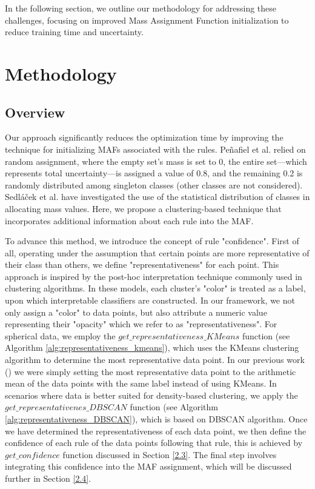 \documentclass[10pt,a4paper,oneside]{article}
\begin{document}
{\color{red}In the following section, we outline our methodology for addressing these challenges, focusing on improved Mass Assignment Function initialization to reduce training time and uncertainty.}
\section{Methodology}\label{1.2}
\subsection{Overview}\label{1.2.2}
Our approach significantly reduces the optimization time by improving the technique for initializing MAFs associated with the rules. Peñafiel et al. \cite{sergio} relied on random assignment, where the empty set's mass is set to 0, the entire set—which represents total uncertainty—is assigned a value of 0.8, and the remaining 0.2 is randomly distributed among singleton classes (other classes are not considered). {\color{black} Sedláček et al. \cite{czechs} have investigated the use of the statistical distribution of classes in allocating mass values}. Here{\color{black},} we propose a {\color{black} clustering-based} technique that incorporates additional information about each rule into the MAF. 

To advance this method, we introduce the concept of rule "confidence". First of all, operating under the assumption that certain points are more representative of their class than others{\color{black},} we define "representativeness" for each point. This approach is inspired by the post-hoc interpretation technique commonly used in clustering algorithms. In these models, each cluster's "color" is treated as a label, upon which interpretable classifiers are constructed. In our framework, we not only assign a "color" to data points{\color{black},} but also attribute a numeric value representing their "opacity" which we refer to as "representativeness". For spherical data, we employ the $get\_representativeness\_KMeans$ function (see Algorithm \ref{alg:representativeness_kmeans}), which uses the KMeans clustering algorithm \cite{kmeans} to determine the most representative data point. {\color{black}In our previous work (\cite{menq}) we were simply setting the most representative data point to the arithmetic mean of the data points with the same label instead of using KMeans.} In scenarios where data is better suited for density-based clustering, we apply the $get\_representativenes\_DBSCAN$ function (see Algorithm \ref{alg:representativeness_DBSCAN}), {\color{black}which is based on DBSCAN \cite{DBSCAN} algorithm.} Once we have determined the representativeness of each data point, we then define the confidence of each rule of the data points following that rule, this is achieved by $get\_confidence$ function discussed in Section \ref{2.3}. The final step involves integrating this confidence into the MAF assignment, which will be discussed further in Section \ref{2.4}.
\end{document}
